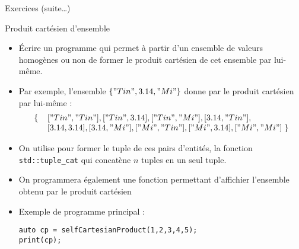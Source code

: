 \documentclass[handout,10pt]{beamer}
\begin{document}
\begin{frame}[fragile]{Exercices (suite\ldots)}
\tiny
\begin{exampleblock}{Produit cartésien d'ensemble}
\begin{itemize}
\item \'Ecrire un programme qui permet à partir d'un ensemble de valeurs homogènes ou non de former le produit cartésien
de cet ensemble par lui-même.
\item Par exemple, l'ensemble $\left\{ "Tin", 3.14, "Mi"\right\}$ donne par le produit cartésien par lui-même :
\[
\begin{array}{ll}
\left\{\right.&["Tin","Tin"], ["Tin",3.14], ["Tin","Mi"], [3.14,"Tin"], \\
       &[3.14,3.14], [3.14,"Mi"], ["Mi","Tin"], ["Mi",3.14],["Mi","Mi"]\left.\right\}
\end{array}
\]
\item On utilise pour former le tuple de ces pairs d'entités, la fonction \lstinline$std::tuple_cat$ qui concatène $n$ tuples en un seul tuple.
\item On programmera également une fonction permettant d'affichier l'ensemble obtenu par le produit cartésien 
\item Exemple de programme principal :
\begin{lstlisting}
auto cp = selfCartesianProduct(1,2,3,4,5);
print(cp);
\end{lstlisting}
\end{itemize}
\end{exampleblock}
\end{frame}
 
\end{document}

